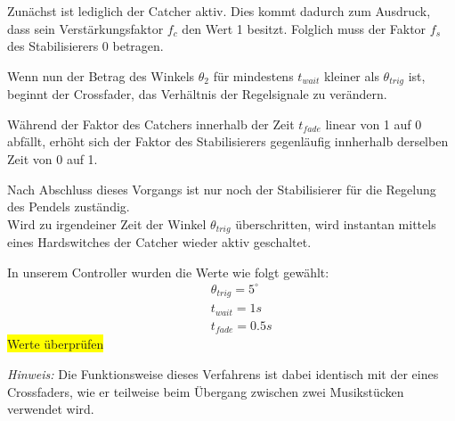 Zunächst ist lediglich der Catcher aktiv. Dies kommt dadurch zum Ausdruck, dass sein Verstärkungsfaktor $f_c$ den Wert 1 besitzt. Folglich muss der Faktor $f_s$ des Stabilisierers 0 betragen.

Wenn nun der Betrag des Winkels $\theta_2$ für mindestens $t_{wait}$ kleiner als $\theta_{trig}$ ist, beginnt der Crossfader, das Verhältnis der Regelsignale zu verändern.

Während der Faktor des Catchers innerhalb der Zeit $t_{fade}$ linear von 1 auf 0 abfällt, erhöht sich der Faktor des Stabilisierers gegenläufig innherhalb derselben Zeit von 0 auf 1.

Nach Abschluss dieses Vorgangs ist nur noch der Stabilisierer für die Regelung des Pendels zuständig. \\

Wird zu irgendeiner Zeit der Winkel $\theta_{trig}$ überschritten, wird instantan mittels eines Hardswitches der Catcher wieder aktiv geschaltet.

In unserem Controller wurden die Werte wie folgt gewählt:
\begin{eqnarray*}
&& \theta_{trig} = 5^{\circ} \\
&& t_{wait} = 1 s \\
&& t_{fade} = 0.5 s
\end{eqnarray*}
\colorbox{yellow}{Werte überprüfen}


\textit{Hinweis:} Die Funktionsweise dieses Verfahrens ist dabei identisch mit der eines Crossfaders, wie er teilweise beim Übergang zwischen zwei Musikstücken verwendet wird.




